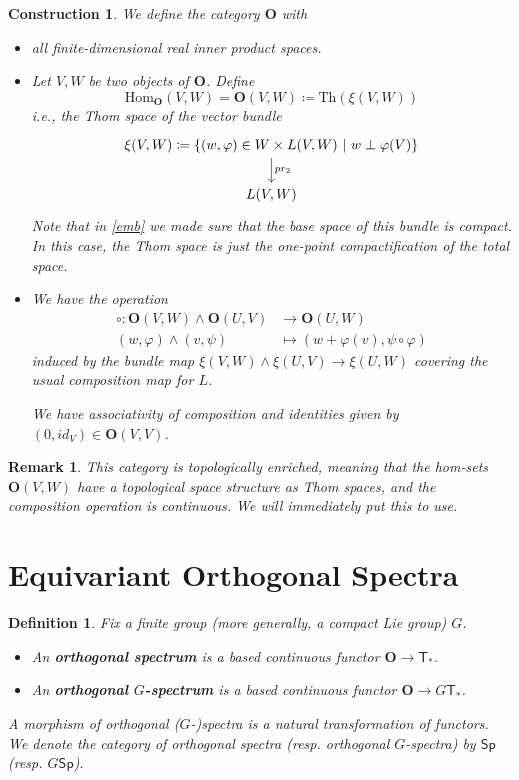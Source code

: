 \documentclass{scrartcl}
\newcommand{\textbi}[1]{\textbf{\textit{#1}}}
\newcommand{\bfO}{\mathbf{O}}
\newcommand{\Hom}{\mathrm{Hom}}
\newtheorem{defin}[subsection]{Definition}
\newtheorem{rem}[subsection]{Remark}
\newtheorem{cons}[subsection]{Construction}
\begin{document}
\begin{cons}
    We define the category $\mathbf{O}$ with
    \begin{itemize}
        \item[Objects:] all finite-dimensional real inner product spaces.
        \item[Morphisms:] Let $V,W$ be two objects of $\bfO$. Define $$\Hom_{\bfO}(V,W)= \bfO(V,W)\coloneqq\text{Th}(\xi(V,W))$$ i.e., the Thom space of the vector bundle 
        \[\begin{tikzcd}
            \xi(V,W)\coloneqq \{(w,\varphi)\in W\times L(V,W)\ |\ w\perp\varphi(V)\} \arrow[d, "pr_2"] \\
            L(V,W)
        \end{tikzcd}\]
        Note that in \ref{emb} we made sure that the base space of this bundle is compact. In this case, the Thom space is just the one-point compactification of the total space.
        \item[Composition:] We have the operation 
        \begin{align*}
            \circ: \bfO(V,W)\wedge \bfO(U,V)&\to \bfO(U,W) \\
            (w,\varphi)\wedge (v,\psi) &\mapsto (w+\varphi(v), \psi\circ\varphi)
        \end{align*} induced by the bundle map $\xi(V,W)\wedge \xi(U,V)\to \xi(U,W)$ covering the usual composition map for $L$.
        \par We have associativity of composition and identities given by $(0, id_V)\in \bfO(V,V)$.
    \end{itemize} 
\end{cons}

\begin{rem}
    This category is topologically enriched, meaning that the hom-sets $\bfO(V,W)$ have a topological space structure as Thom spaces, and the composition operation is continuous. We will immediately put this to use. 
\end{rem}

\section{Equivariant Orthogonal Spectra}

\begin{defin}\label{def}
    Fix a finite group (more generally, a compact Lie group) $G$.
    \begin{itemize}
        \item An \textbi{orthogonal spectrum} is a based continuous functor $\bfO\to \mathsf{T}_*$.
        \item An \textbi{orthogonal $G$-spectrum} is a based continuous functor $\bfO\to G\mathsf{T}_*$. 
    \end{itemize}
    A morphism of orthogonal ($G$-)spectra is a natural transformation of functors. We denote the category of orthogonal spectra (resp. orthogonal $G$-spectra) by $\mathsf{Sp}$ (resp. $G\mathsf{Sp}$).
\end{defin}
\end{document}

